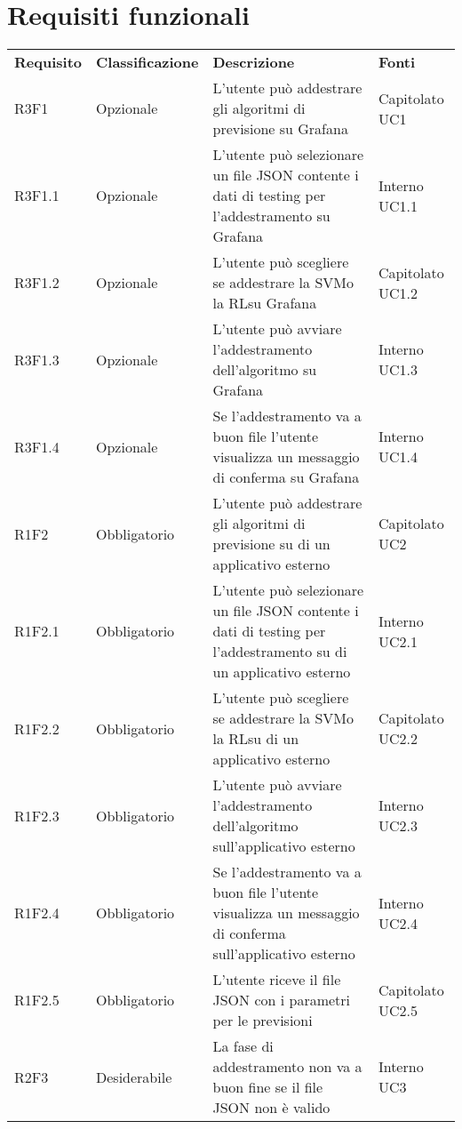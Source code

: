 \section{Requisiti funzionali}
	\begin{longtable} {
		>{}p{24mm} 
		>{}p{32mm}
		>{}p{40mm} 
		>{}p{24.5mm}
		}
	\rowcolor{gray!50}
		\textbf{Requisito} & \textbf{Classificazione} & \textbf{Descrizione} & \textbf{Fonti} 	\TBstrut \\
		R3F1 & Opzionale & L'utente può addestrare gli algoritmi di previsione su Grafana\glo & Capitolato UC1 \TBstrut \\ [2mm]
		R3F1.1 & Opzionale & L'utente può selezionare un file JSON contente i dati di testing per l'addestramento su Grafana\glo & Interno UC1.1 \TBstrut \\ [2mm]
		R3F1.2 & Opzionale & L'utente può scegliere se addestrare la SVM\glosp o la RL\glosp su Grafana\glo & Capitolato UC1.2 \TBstrut \\ [2mm]
		R3F1.3 & Opzionale & L'utente può avviare l'addestramento dell'algoritmo su Grafana\glo & Interno UC1.3 \TBstrut \\ [2mm]
		R3F1.4 & Opzionale & Se l'addestramento va a buon file l'utente visualizza un messaggio di conferma su Grafana\glo & Interno UC1.4 \TBstrut \\ [2mm]
		R1F2 & Obbligatorio & L'utente può addestrare gli algoritmi di previsione su di un applicativo esterno & Capitolato UC2 \TBstrut \\ [2mm]
		R1F2.1 & Obbligatorio & L'utente può selezionare un file JSON contente i dati di testing per l'addestramento su di un applicativo esterno & Interno UC2.1 \TBstrut \\ [2mm]
		R1F2.2 & Obbligatorio & L'utente può scegliere se addestrare la SVM\glosp o la RL\glosp su di un applicativo esterno & Capitolato UC2.2 \TBstrut \\ [2mm]
		R1F2.3 & Obbligatorio & L'utente può avviare l'addestramento dell'algoritmo sull'applicativo esterno & Interno UC2.3 \TBstrut \\ [2mm]
		R1F2.4 & Obbligatorio & Se l'addestramento va a buon file l'utente visualizza un messaggio di conferma sull'applicativo esterno & Interno UC2.4 \TBstrut \\ [2mm]
		R1F2.5 & Obbligatorio & L'utente riceve il file JSON con i parametri per le previsioni & Capitolato UC2.5 \TBstrut \\ [2mm]
		R2F3 & Desiderabile & La fase di addestramento non va a buon fine se il file JSON non è valido & Interno UC3 \TBstrut \\ [2mm]

\end{longtable}

